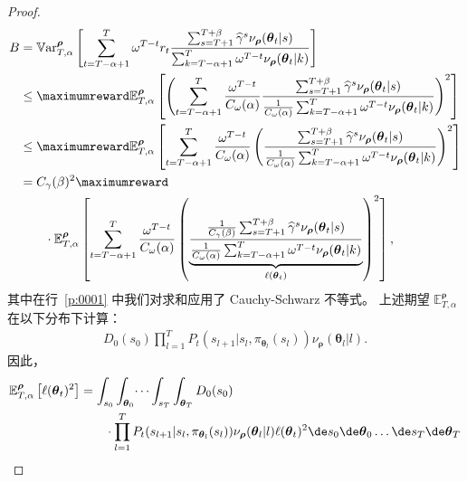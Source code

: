 \begin{proof}
\begin{align}
    B
    & = \mathbb{V}\mathrm{ar}^{\boldsymbol\rho}_{T,\alpha} \left[
        \sum_{t=T-\alpha+1}^{T} \omega^{T-t}  r_t  \frac{\sum_{s=T+1}^{T+\beta} \widehat{\gamma}^s\nu_{\boldsymbol\rho}(\boldsymbol\theta_t\vert s)}{\sum_{k=T-\alpha+1}^T \omega^{T-t}\nu_{\boldsymbol\rho}(\boldsymbol\theta_t \vert k)}
    \right]\notag \\
    & \le \maximumreward  \mathbb{E}^{\boldsymbol\rho}_{T,\alpha} \left[\left(
        \sum_{t=T-\alpha+1}^{T} \frac{\omega^{T-t}}{C_\omega(\alpha)} \frac{\sum_{s=T+1}^{T+\beta} \widehat{\gamma}^s\nu_{\boldsymbol\rho}(\boldsymbol\theta_t\vert s)}{\frac{1}{C_\omega(\alpha)}\sum_{k=T-\alpha+1}^T \omega^{T-t}\nu_{\boldsymbol\rho}(\boldsymbol\theta_t \vert k)}\right)^2
    \right] \nonumber\\
    & \le \maximumreward  \mathbb{E}^{\boldsymbol\rho}_{T,\alpha} \left[
        \sum_{t=T-\alpha+1}^{T} \frac{\omega^{T-t}}{C_\omega(\alpha)} \left( \frac{\sum_{s=T+1}^{T+\beta} \widehat{\gamma}^s\nu_{\boldsymbol\rho}(\boldsymbol\theta_t\vert s)}{\frac{1}{C_\omega(\alpha)} \sum_{k=T-\alpha+1}^T \omega^{T-t}\nu_{\boldsymbol\rho}(\boldsymbol\theta_t \vert k)}\right)^2
    \right] \label{p:0001} \\
    & = C_\gamma(\beta)^2 \maximumreward \nonumber
    \\
    &\qquad\cdot \mathbb{E}^{\boldsymbol\rho}_{T,\alpha} \left[
        \sum_{t=T-\alpha+1}^{T} \frac{\omega^{T-t}}{C_\omega(\alpha)} \left( \underbrace{\frac{\frac{1}{C_\gamma(\beta)} \sum_{s=T+1}^{T+\beta} \widehat{\gamma}^s\nu_{\boldsymbol\rho}(\boldsymbol\theta_t\vert s)}{\frac{1}{C_\omega(\alpha)} \sum_{k=T-\alpha+1}^T \omega^{T-t}\nu_{\boldsymbol\rho}(\boldsymbol\theta_t \vert k)}}_{\ell(\boldsymbol\theta_t)}\right)^2 \nonumber
    \right],
\end{align}
其中在行~\eqref{p:0001} 中我们对求和应用了 Cauchy-Schwarz 不等式。
上述期望 $\mathbb{E}^{\boldsymbol\rho}_{T,\alpha}$ 在以下分布下计算：
\begin{align*}
    D_0(s_0) \prod_{l=1}^{T} P_t(s_{l+1}\vert s_l, \pi_{\boldsymbol\theta_l}(s_l)) \nu_{\boldsymbol\rho}(\boldsymbol\theta_l\vert l).
\end{align*}
因此，
\begin{align*}
   \mathbb{E}^{\boldsymbol\rho}_{T,\alpha} \left[\ell(\boldsymbol\theta_t)^2 \right] &= \int_{s_0}\int_{\boldsymbol\theta_0} \dots \int_{s_T} \int_{\boldsymbol\theta_T}  D_0(s_0)
   \\
   &\qquad \cdot\prod_{l=1}^{T} P_t(s_{l+1}\vert s_l, \pi_{\boldsymbol\theta_l}(s_l)) \nu_{\boldsymbol\rho}(\boldsymbol\theta_l\vert l) \ell(\boldsymbol\theta_t)^2 \de s_0 \de \boldsymbol\theta_0 \dots \de s_T \de \boldsymbol\theta_T  \\

\end{align*}
\end{proof}
